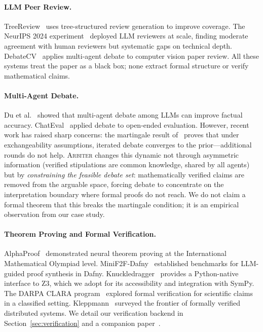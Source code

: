 \documentclass[11pt]{article}
\newcommand{\arbiter}{\textsc{Arbiter}}
\begin{document}
\paragraph{LLM Peer Review.}
TreeReview~\cite{treereview2025} uses tree-structured review generation to improve coverage.
The NeurIPS 2024 experiment~\cite{neurips2024} deployed LLM reviewers at scale, finding moderate agreement with human reviewers but systematic gaps on technical depth.
DebateCV~\cite{debatecv2025} applies multi-agent debate to computer vision paper review.
All these systems treat the paper as a black box; none extract formal structure or verify mathematical claims.

\paragraph{Multi-Agent Debate.}
Du et al.~\cite{du2023} showed that multi-agent debate among LLMs can improve factual accuracy.
ChatEval~\cite{chateval2023} applied debate to open-ended evaluation.
However, recent work has raised sharp concerns: the martingale result of~\cite{debateskepticism2025} proves that under exchangeability assumptions, iterated debate converges to the prior---additional rounds do not help.
\arbiter{} changes this dynamic not through asymmetric information (verified stipulations are common knowledge, shared by all agents) but by \emph{constraining the feasible debate set}: mathematically verified claims are removed from the arguable space, forcing debate to concentrate on the interpretation boundary where formal proofs do not reach. We do not claim a formal theorem that this breaks the martingale condition; it is an empirical observation from our case study.

\paragraph{Theorem Proving and Formal Verification.}
AlphaProof~\cite{alphaproof2025} demonstrated neural theorem proving at the International Mathematical Olympiad level.
MiniF2F-Dafny~\cite{minif2f2026} established benchmarks for LLM-guided proof synthesis in Dafny.
Knuckledragger~\cite{knuckledragger2024} provides a Python-native interface to Z3, which we adopt for its accessibility and integration with SymPy.
The DARPA CLARA program~\cite{darpa2025} explored formal verification for scientific claims in a classified setting.
Kleppmann~\cite{kleppmann2024} surveyed the frontier of formally verified distributed systems.
We detail our verification backend in Section~\ref{sec:verification} and a companion paper~\cite{arbiterpaperA}.
\end{document}
